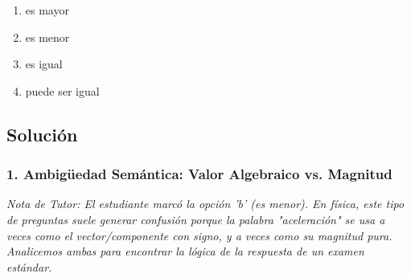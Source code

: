\documentclass[12pt, a4paper]{article}
\begin{document}
\begin{center}
\end{center}

\begin{enumerate}[label=\alph*)]
    \item es mayor
    \item es menor
    \item es igual
    \item puede ser igual
\end{enumerate}


\subsection*{Solución}

\subsubsection*{1. Ambigüedad Semántica: Valor Algebraico vs. Magnitud}
\textit{Nota de Tutor: El estudiante marcó la opción 'b' (es menor). En física, este tipo de preguntas suele generar confusión porque la palabra "aceleración" se usa a veces como el vector/componente con signo, y a veces como su magnitud pura. Analicemos ambas para encontrar la lógica de la respuesta de un examen estándar.}
\end{document}
